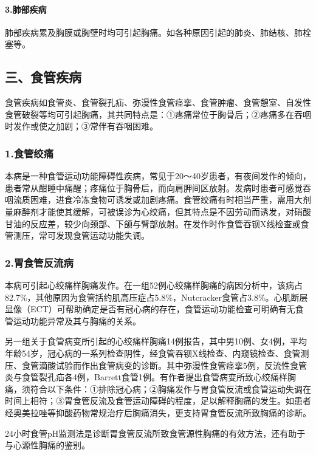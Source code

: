 \paragraph{3.肺部疾病}

肺部疾病累及胸膜或胸壁时均可引起胸痛。如各种原因引起的肺炎、肺结核、肺栓塞等。

\protect\hypertarget{text00096.html}{}{}

\subsection{三、食管疾病}

食管疾病如食管炎、食管裂孔疝、弥漫性食管痉挛、食管肿瘤、食管憩室、自发性食管破裂等均可引起胸痛，其共同特点是：①疼痛常位于胸骨后；②疼痛多在吞咽时发作或使之加剧；③常伴有吞咽困难。

\subsubsection{1.食管绞痛}

本病是一种食管运动功能障碍性疾病，常见于20～40岁患者，有夜间发作的倾向，患者常从酣睡中痛醒；疼痛位于胸骨后，而向肩胛间区放射。发病时患者可感觉吞咽流质困难，进食冷冻食物可诱发或加剧疼痛。食管绞痛有时相当严重，需用大剂量麻醉剂才能使其缓解，可被误诊为心绞痛，但其特点是不因劳动而诱发，对硝酸甘油的反应差，较少向颈部、下颌与臂部放射。在发作时作食管吞钡X线检查或食管测压，常可发现食管运动功能失调。

\subsubsection{2.胃食管反流病}

本病可引起心绞痛样胸痛发作。在一组52例心绞痛样胸痛的病因分析中，该病占82.7\%，其他原因为食管括约肌高压症占5.8\%，Nutcracker食管占3.8\%。心肌断层显像（ECT）可帮助确定是否有冠心病的存在，食管运动功能检查可明确有无食管运动功能异常及其与胸痛的关系。

另一组关于食管病变所引起的心绞痛样胸痛14例报告，其中男10例、女4例，平均年龄54岁，冠心病的一系列检查阴性，经食管吞钡X线检查、内窥镜检查、食管测压、食管滴酸试验而作出食管病变的诊断。其中弥漫性食管痉挛5例，反流性食管炎与食管裂孔疝各4例，Barrett食管1例。有作者提出食管病变所致心绞痛样胸痛，须符合以下条件：①排除冠心病；②胸痛发作与胃食管反流或食管运动失调在时间上相符；③胃食管反流及食管运动障碍的程度，足以解释胸痛的发生。如患者经奥美拉唑等抑酸药物常规治疗后胸痛消失，更支持胃食管反流所致胸痛的诊断。

24小时食管pH监测法是诊断胃食管反流所致食管源性胸痛的有效方法，还有助于与心源性胸痛的鉴别。

